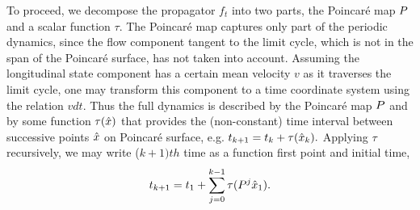 \begin{description}
To proceed, we decompose the propagator $f_t$ into two parts, the
Poincar\'e map $P$ and a scalar function $\tau$.  The Poincar\'e map
captures only part of the periodic dynamics, since the flow component
tangent to the limit cycle, which is not in the span of the
Poincar\'e surface, has not  taken into account.
Assuming the longitudinal state component has a certain mean velocity
$v$ as it traverses the limit cycle, one may transform this component
to a time coordinate system using the relation $v dt$.  Thus the full
dynamics is described by the Poincar\'e map $P$ and by some function
$\tau(\hat{x})$  that provides the (non-constant) time interval between
successive points $\hat{x}$ on Poincar\'e surface, e.g. $t_{k+1}  = t_k
+ \tau(\hat{x}_k).$
%
%
Applying $\tau$ recursively, we may write ($k+1)th$ time as a
function first point and initial time,
%
\begin{eqnarray}
 t_{k+1}  = t _1+ \sum_{j=0}^{k-1}\tau(P^j\hat{x}_1).
 \label{eq:poirec2}
\end{eqnarray}
%
%


\end{description}
